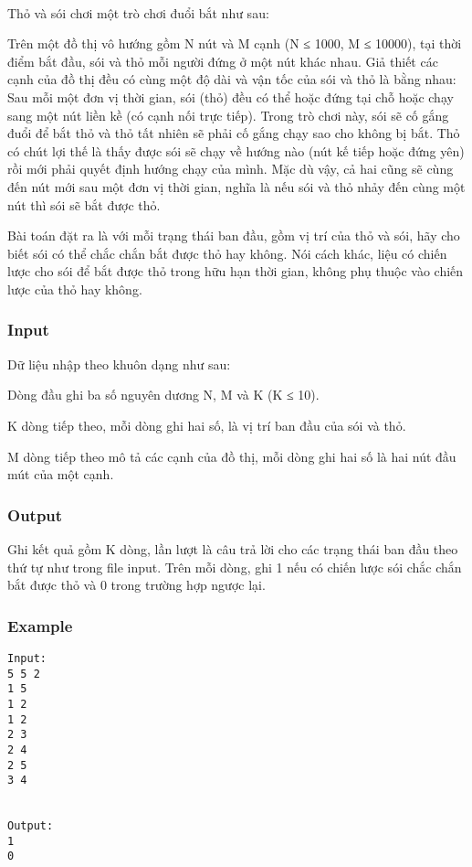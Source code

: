 

 

Thỏ và sói chơi một trò chơi đuổi bắt như sau:

Trên một đồ thị vô hướng gồm N nút và M cạnh (N ≤ 1000, M ≤ 10000), tại thời điểm bắt đầu, sói và thỏ mỗi người đứng ở một nút khác nhau. Giả thiết các cạnh của đồ thị đều có cùng một độ dài và vận tốc của sói và thỏ là bằng nhau: Sau mỗi một đơn vị thời gian, sói (thỏ) đều có thể hoặc đứng tại chỗ hoặc chạy sang một nút liền kề (có cạnh nối trực tiếp). Trong trò chơi này, sói sẽ cố gắng đuổi để bắt thỏ và thỏ tất nhiên sẽ phải cố gắng chạy sao cho không bị bắt. Thỏ có chút lợi thế là thấy được sói sẽ chạy về hướng nào (nút kế tiếp hoặc đứng yên) rồi mới phải quyết định hướng chạy của mình. Mặc dù vậy, cả hai cũng sẽ cùng đến nút mới sau một đơn vị thời gian, nghĩa là nếu sói và thỏ nhảy đến cùng một nút thì sói sẽ bắt được thỏ.

Bài toán đặt ra là với mỗi trạng thái ban đầu, gồm vị trí của thỏ và sói, hãy cho biết sói có thể chắc chắn bắt được thỏ hay không. Nói cách khác, liệu có chiến lược cho sói để bắt được thỏ trong hữu hạn thời gian, không phụ thuộc vào chiến lược của thỏ hay không.

\subsubsection{Input}

Dữ liệu nhập theo khuôn dạng như sau:

Dòng đầu ghi ba số nguyên dương N, M và K (K ≤ 10).

K dòng tiếp theo, mỗi dòng ghi hai số, là vị trí ban đầu của sói và thỏ.

M dòng tiếp theo mô tả các cạnh của đồ thị, mỗi dòng ghi hai số là hai nút đầu mút của một cạnh.

\subsubsection{Output}

Ghi kết quả gồm K dòng, lần lượt là câu trả lời cho các trạng thái ban đầu theo thứ tự như trong file input. Trên mỗi dòng, ghi 1 nếu có chiến lược sói chắc chắn bắt được thỏ và 0 trong trường hợp ngược lại.

\subsubsection{Example}
\begin{verbatim}
Input:
5 5 2
1 5
1 2
1 2
2 3
2 4
2 5
3 4


Output:
1
0

\end{verbatim}